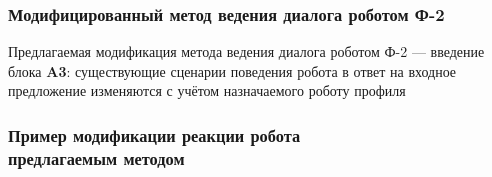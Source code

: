 \documentclass{beamer}
\let\raggedright=\RaggedRight
\begin{document}

\begin{frame}
    \frametitle{Модифицированный метод ведения диалога роботом Ф-2}
    \vspace{-0.2cm}
    \noindent

    \vfill
    \begin{minipage}{1\textwidth}
        \raggedright
        \small
        Предлагаемая модификация метода ведения диалога роботом Ф-2 --- введение блока \textbf{A3}: существующие сценарии поведения робота в ответ на входное предложение изменяются с учётом назначаемого роботу профиля

    \end{minipage}
\end{frame}



\begin{frame}
    \frametitle{Пример модификации реакции робота \\ предлагаемым методом}
    \begin{figure}
        \centering
        
    \end{figure}
\end{frame}

\end{document}
